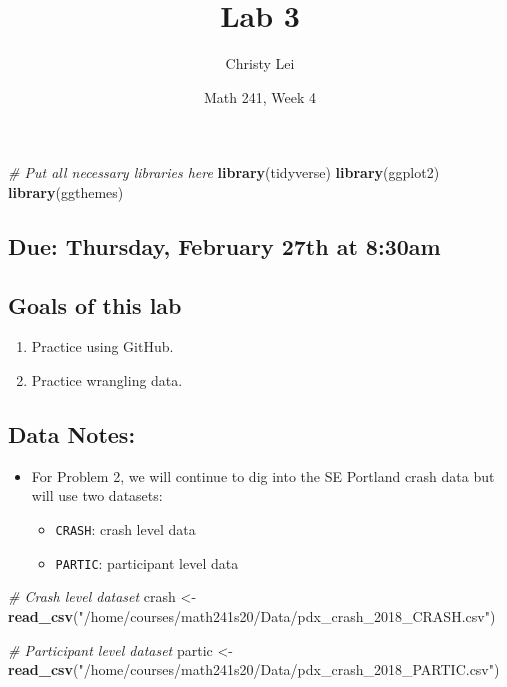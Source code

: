 \documentclass[]{article}
\title{Lab 3}
\author{Christy Lei}
\date{Math 241, Week 4}
\newenvironment{Shaded}{\begin{snugshade}}{\end{snugshade}}
\newcommand{\KeywordTok}[1]{\textcolor[rgb]{0.13,0.29,0.53}{\textbf{#1}}}
\newcommand{\StringTok}[1]{\textcolor[rgb]{0.31,0.60,0.02}{#1}}
\newcommand{\CommentTok}[1]{\textcolor[rgb]{0.56,0.35,0.01}{\textit{#1}}}
\newcommand{\NormalTok}[1]{#1}
\providecommand{\tightlist}{%
  \setlength{\itemsep}{0pt}\setlength{\parskip}{0pt}}
\begin{document}
\maketitle

\begin{Shaded}
\begin{Highlighting}[]
\CommentTok{# Put all necessary libraries here}
\KeywordTok{library}\NormalTok{(tidyverse)}
\KeywordTok{library}\NormalTok{(ggplot2)}
\KeywordTok{library}\NormalTok{(ggthemes)}
\end{Highlighting}
\end{Shaded}

\subsection{Due: Thursday, February 27th at
8:30am}\label{due-thursday-february-27th-at-830am}

\subsection{Goals of this lab}\label{goals-of-this-lab}

\begin{enumerate}
\def\labelenumi{\arabic{enumi}.}
\tightlist
\item
  Practice using GitHub.
\item
  Practice wrangling data.
\end{enumerate}

\subsection{Data Notes:}\label{data-notes}

\begin{itemize}
\tightlist
\item
  For Problem 2, we will continue to dig into the SE Portland crash data
  but will use two datasets:

  \begin{itemize}
  \tightlist
  \item
    \texttt{CRASH}: crash level data
  \item
    \texttt{PARTIC}: participant level data
  \end{itemize}
\end{itemize}

\begin{Shaded}
\begin{Highlighting}[]
\CommentTok{# Crash level dataset}
\NormalTok{crash <-}\StringTok{ }\KeywordTok{read_csv}\NormalTok{(}\StringTok{"/home/courses/math241s20/Data/pdx_crash_2018_CRASH.csv"}\NormalTok{)}

\CommentTok{# Participant level dataset}
\NormalTok{partic <-}\StringTok{ }\KeywordTok{read_csv}\NormalTok{(}\StringTok{"/home/courses/math241s20/Data/pdx_crash_2018_PARTIC.csv"}\NormalTok{)}
\end{Highlighting}
\end{Shaded}
\end{document}
